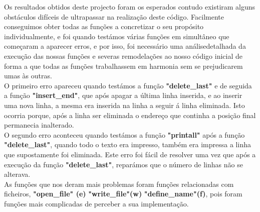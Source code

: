 \documentclass[letterpaper,12pt]{article}
\begin{document}
Os resultados obtidos deste projecto foram os esperados contudo existiram alguns obstáculos difíceis de ultrapassar na realização deste código.
Facilmente conseguimos obter todas as funções a concretizar o seu propósito individualmente, e foi quando testámos várias funções em simultâneo que começaram a aparecer erros, e por isso, foi necessário uma análise\newline detalhada da execução das nossas funções e severas remodelações ao nosso código inicial de forma a que todas as funções trabalhassem em harmonia sem se prejudicarem umas às outras.\vspace{0.5cm}\\
O primeiro erro apareceu quando testámos a função \textbf{"delete\_last"} e de seguida a função \textbf{"insert\_end"}, que após apagar a última linha inserida, e ao inserir uma nova linha, a mesma era inserida na linha a seguir á linha eliminada. Isto ocorria porque, após a linha ser eliminada o endereço que continha a posição final permanecia inalterado.\vspace{0.5cm}\\
O segundo erro aconteceu quando testámos a função \textbf{"printall"} após a função \textbf{"delete\_last"}, quando todo o texto era impresso, também era impressa a linha que supostamente foi eliminada. Este erro foi fácil de resolver uma vez que após a execução da função \textbf{"delete\_last"}, reparámos que o número de linhas não se alterava.\vspace{0.5cm}\\
As funções que nos deram mais problemas foram funções relacionadas com ficheiros, \textbf{"open\_file" \textbf{(e)}} \textbf{"write\_file"\textbf{(w)}} \textbf{"define\_name"\textbf{(f)}}, pois foram funções mais complicadas de perceber a sua implementação.
\\
\newpage
\end{document}
